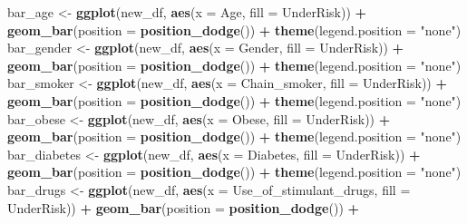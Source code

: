 \documentclass[
  10pt,
  spanish,
]{article}
\newenvironment{Shaded}{\begin{snugshade}}{\end{snugshade}}
\newcommand{\DataTypeTok}[1]{\textcolor[rgb]{0.13,0.29,0.53}{#1}}
\newcommand{\KeywordTok}[1]{\textcolor[rgb]{0.13,0.29,0.53}{\textbf{#1}}}
\newcommand{\NormalTok}[1]{#1}
\newcommand{\OperatorTok}[1]{\textcolor[rgb]{0.81,0.36,0.00}{\textbf{#1}}}
\newcommand{\StringTok}[1]{\textcolor[rgb]{0.31,0.60,0.02}{#1}}
\begin{document}
\begin{Shaded}
\begin{Highlighting}[]
\NormalTok{bar\_age \textless{}{-}}\StringTok{ }\KeywordTok{ggplot}\NormalTok{(new\_df, }\KeywordTok{aes}\NormalTok{(}\DataTypeTok{x =}\NormalTok{ Age, }\DataTypeTok{fill =}\NormalTok{ UnderRisk)) }\OperatorTok{+}
\StringTok{    }\KeywordTok{geom\_bar}\NormalTok{(}\DataTypeTok{position =} \KeywordTok{position\_dodge}\NormalTok{()) }\OperatorTok{+}
\StringTok{    }\KeywordTok{theme}\NormalTok{(}\DataTypeTok{legend.position =} \StringTok{"none"}\NormalTok{)}
\NormalTok{bar\_gender \textless{}{-}}\StringTok{ }\KeywordTok{ggplot}\NormalTok{(new\_df, }\KeywordTok{aes}\NormalTok{(}\DataTypeTok{x =}\NormalTok{ Gender, }\DataTypeTok{fill =}\NormalTok{ UnderRisk)) }\OperatorTok{+}
\StringTok{    }\KeywordTok{geom\_bar}\NormalTok{(}\DataTypeTok{position =} \KeywordTok{position\_dodge}\NormalTok{()) }\OperatorTok{+}
\StringTok{    }\KeywordTok{theme}\NormalTok{(}\DataTypeTok{legend.position =} \StringTok{"none"}\NormalTok{)}
\NormalTok{bar\_smoker \textless{}{-}}\StringTok{ }\KeywordTok{ggplot}\NormalTok{(new\_df, }\KeywordTok{aes}\NormalTok{(}\DataTypeTok{x =}\NormalTok{ Chain\_smoker, }\DataTypeTok{fill =}\NormalTok{ UnderRisk)) }\OperatorTok{+}
\StringTok{    }\KeywordTok{geom\_bar}\NormalTok{(}\DataTypeTok{position =} \KeywordTok{position\_dodge}\NormalTok{()) }\OperatorTok{+}
\StringTok{    }\KeywordTok{theme}\NormalTok{(}\DataTypeTok{legend.position =} \StringTok{"none"}\NormalTok{)}
\NormalTok{bar\_obese \textless{}{-}}\StringTok{ }\KeywordTok{ggplot}\NormalTok{(new\_df, }\KeywordTok{aes}\NormalTok{(}\DataTypeTok{x =}\NormalTok{ Obese, }\DataTypeTok{fill =}\NormalTok{ UnderRisk)) }\OperatorTok{+}
\StringTok{    }\KeywordTok{geom\_bar}\NormalTok{(}\DataTypeTok{position =} \KeywordTok{position\_dodge}\NormalTok{()) }\OperatorTok{+}
\StringTok{    }\KeywordTok{theme}\NormalTok{(}\DataTypeTok{legend.position =} \StringTok{"none"}\NormalTok{)}
\NormalTok{bar\_diabetes \textless{}{-}}\StringTok{ }\KeywordTok{ggplot}\NormalTok{(new\_df, }\KeywordTok{aes}\NormalTok{(}\DataTypeTok{x =}\NormalTok{ Diabetes, }\DataTypeTok{fill =}\NormalTok{ UnderRisk)) }\OperatorTok{+}
\StringTok{    }\KeywordTok{geom\_bar}\NormalTok{(}\DataTypeTok{position =} \KeywordTok{position\_dodge}\NormalTok{()) }\OperatorTok{+}
\StringTok{    }\KeywordTok{theme}\NormalTok{(}\DataTypeTok{legend.position =} \StringTok{"none"}\NormalTok{)}
\NormalTok{bar\_drugs \textless{}{-}}\StringTok{ }\KeywordTok{ggplot}\NormalTok{(new\_df, }\KeywordTok{aes}\NormalTok{(}\DataTypeTok{x =}\NormalTok{ Use\_of\_stimulant\_drugs, }\DataTypeTok{fill =}\NormalTok{ UnderRisk)) }\OperatorTok{+}
\StringTok{    }\KeywordTok{geom\_bar}\NormalTok{(}\DataTypeTok{position =} \KeywordTok{position\_dodge}\NormalTok{()) }\OperatorTok{+}

\end{Highlighting}
\end{Shaded}
\end{document}

